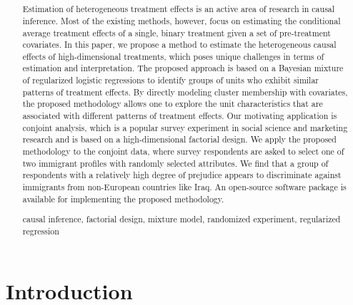 \blind
\title{\bf \tit}

\maketitle
\fi

\setcounter{page}{0}
\thispagestyle{empty}
\vspace{-1em}
\begin{abstract}

  Estimation of heterogeneous treatment effects is an active area of
  research in causal inference.  Most of the existing methods,
  however, focus on estimating the conditional average treatment
  effects of a single, binary treatment given a set of pre-treatment
  covariates.  In this paper, we propose a method to estimate the
  heterogeneous causal effects of high-dimensional treatments, which
  poses unique challenges in terms of estimation and interpretation.
  The proposed approach is based on a Bayesian mixture of regularized logistic
  regressions to identify groups of units who exhibit similar patterns
  of treatment effects.  By directly modeling cluster membership with
  covariates, the proposed methodology allows one to explore the unit
  characteristics that are associated with different patterns of
  treatment effects.  Our motivating application is conjoint analysis,
  which is a popular survey experiment in social science and marketing
  research and is based on a high-dimensional factorial design.  We
  apply the proposed methodology to the conjoint data, where survey
  respondents are asked to select one of two immigrant profiles with
  randomly selected attributes.  We find that a group of respondents
  with a relatively high degree of prejudice appears to discriminate
  against immigrants from non-European countries like Iraq. An
  open-source software package is available for implementing the
  proposed methodology.

  \bigskip
{} causal inference, factorial design, mixture model, randomized experiment, regularized regression
  
\end{abstract}


\section{Introduction}

